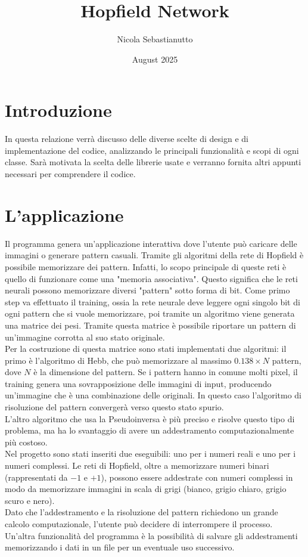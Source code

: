 \documentclass{article}
\title{Hopfield Network}
\author{Nicola Sebastianutto}
\date{August 2025}
\begin{document}
\maketitle

\section{Introduzione}
In questa relazione verrà discusso delle diverse scelte di design e di implementazione del codice, analizzando le principali funzionalità e scopi di ogni classe. Sarà motivata la scelta delle librerie usate e verranno fornita altri appunti necessari per comprendere il codice.

\section{L'applicazione}
Il programma genera un'applicazione interattiva dove l'utente può caricare delle immagini o generare pattern casuali. Tramite gli algoritmi della rete di Hopfield è possibile memorizzare dei pattern. Infatti, lo scopo principale di queste reti è quello di funzionare come una "memoria associativa". Questo significa che le reti neurali possono memorizzare diversi "pattern" sotto forma di bit. Come primo step va effettuato il training, ossia la rete neurale deve leggere ogni singolo bit di ogni pattern che si vuole memorizzare, poi tramite un algoritmo viene generata una matrice dei pesi. Tramite questa matrice è possibile riportare un pattern di un'immagine corrotta al suo stato originale.
\\
Per la costruzione di questa matrice sono stati implementati due algoritmi: il primo è l'algoritmo di Hebb, che può memorizzare al massimo $0.138 \times N$ pattern, dove $N$ è la dimensione del pattern. Se i pattern hanno in comune molti pixel, il training genera una sovrapposizione delle immagini di input, producendo un'immagine che è una combinazione delle originali. In questo caso l'algoritmo di risoluzione del pattern convergerà verso questo stato spurio.
\\
L'altro algoritmo che usa la Pseudoinversa è più preciso e risolve questo tipo di problema, ma ha lo svantaggio di avere  un addestramento computazionalmente più costoso. 
\\
Nel progetto sono stati inseriti due eseguibili: uno per i numeri reali e uno per i numeri complessi. Le reti di Hopfield, oltre a memorizzare numeri binari (rappresentati da $-1$ e $+1$), possono essere addestrate con numeri complessi in modo da memorizzare immagini in scala di grigi (bianco, grigio chiaro, grigio scuro e nero).
\\
Dato che l'addestramento e la risoluzione del pattern richiedono un grande calcolo computazionale, l'utente può decidere di interrompere il processo. Un'altra funzionalità del programma è la possibilità di salvare gli addestramenti memorizzando i dati in un file per un eventuale uso successivo.
\end{document}
